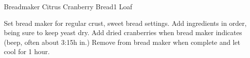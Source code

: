\begin{recipe}{Breadmaker Citrus Cranberry Bread}{1 Loaf}{}



    Set bread maker for regular crust, sweet bread settings. Add ingredients in order, being sure to keep yeast dry. Add dried cranberries when bread maker indicates (beep, often about 3:15h in.) Remove from bread maker when complete and let cool for 1 hour.

\end{recipe}